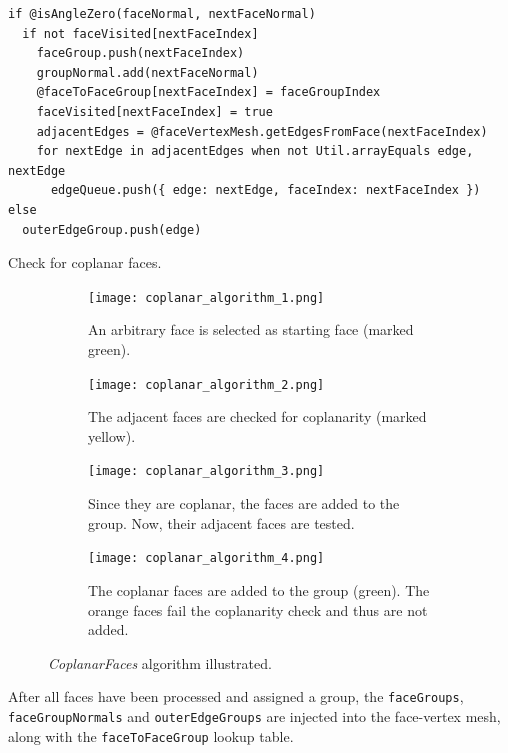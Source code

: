 \documentclass[../ClassicThesis.tex]{subfiles}
\begin{document}
\begin{listing}
\begin{verbatim}
if @isAngleZero(faceNormal, nextFaceNormal)
  if not faceVisited[nextFaceIndex]
    faceGroup.push(nextFaceIndex)
    groupNormal.add(nextFaceNormal)
    @faceToFaceGroup[nextFaceIndex] = faceGroupIndex
    faceVisited[nextFaceIndex] = true
    adjacentEdges = @faceVertexMesh.getEdgesFromFace(nextFaceIndex)
    for nextEdge in adjacentEdges when not Util.arrayEquals edge, nextEdge
      edgeQueue.push({ edge: nextEdge, faceIndex: nextFaceIndex })
else
  outerEdgeGroup.push(edge)
\end{verbatim}
\caption{Check for coplanar faces.}
\label{lst:coplanarcheck}
\end{listing}

\begin{figure}
  \centering
  \begin{subfigure}[t]{0.4\textwidth}
    \centering
    \texttt{[image: coplanar\_algorithm\_1.png]}
    \caption{An arbitrary face is selected as starting face (marked green).}
    \label{fig:coplanar_algorithm_1}
  \end{subfigure}
  \begin{subfigure}[t]{0.4\textwidth}
    \centering
    \texttt{[image: coplanar\_algorithm\_2.png]}
    \caption{The adjacent faces are checked for coplanarity (marked yellow).}
    \label{fig:coplanar_algorithm_2}
  \end{subfigure}
  \begin{subfigure}[t]{0.4\textwidth}
    \centering
    \texttt{[image: coplanar\_algorithm\_3.png]}
    \caption{Since they are coplanar, the faces are added to the group. Now, their adjacent faces are tested.}
    \label{fig:coplanar_algorithm_3}
  \end{subfigure}
  \begin{subfigure}[t]{0.4\textwidth}
    \centering
    \texttt{[image: coplanar\_algorithm\_4.png]}
    \caption{The coplanar faces are added to the group (green). The orange faces fail the coplanarity check and thus are not added.}
    \label{fig:coplanar_algorithm_4}
  \end{subfigure}
  \caption{\emph{CoplanarFaces} algorithm illustrated.}
  \label{fig:coplanar_algorithm}
\end{figure}

After all faces have been processed and assigned a group, the \texttt{faceGroups}, \texttt{faceGroupNormals} and \texttt{outerEdgeGroups} are injected into the face-vertex mesh, along with the \texttt{faceToFaceGroup} lookup table.
\end{document}
